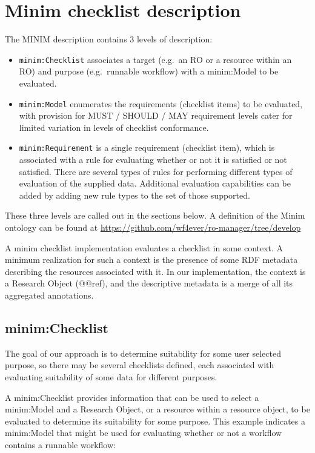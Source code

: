 \documentclass[]{article}
\author{}
\date{}
\begin{document}
{
\hypersetup{linkcolor=black}
\setcounter{tocdepth}{3}
\tableofcontents
}
\section{Minim checklist description}

The MINIM description contains 3 levels of description:

\begin{itemize}
\itemsep1pt\parskip0pt
\item
  \texttt{minim:Checklist} associates a target (e.g.~an RO or a resource
  within an RO) and purpose (e.g.~runnable workflow) with a minim:Model
  to be evaluated.
\item
  \texttt{minim:Model} enumerates the requirements (checklist items) to
  be evaluated, with provision for MUST / SHOULD / MAY requirement
  levels cater for limited variation in levels of checklist conformance.
\item
  \texttt{minim:Requirement} is a single requirement (checklist item),
  which is associated with a rule for evaluating whether or not it is
  satisfied or not satisfied. There are several types of rules for
  performing different types of evaluation of the supplied data.
  Additional evaluation capabilities can be added by adding new rule
  types to the set of those supported.
\end{itemize}

These three levels are called out in the sections below. A definition of
the Minim ontology can be found at
\href{}{https://github.com/wf4ever/ro-manager/tree/develop}

A minim checklist implementation evaluates a checklist in some context.
A minimum realization for such a context is the presence of some RDF
metadata describing the resources associated with it. In our
implementation, the context is a Research Object (@@ref), and the
descriptive metadata is a merge of all its aggregated annotations.

\subsection{minim:Checklist}

The goal of our approach is to determine suitability for some user
selected purpose, so there may be several checklists defined, each
associated with evaluating suitability of some data for different
purposes.

A minim:Checklist provides information that can be used to select a
minim:Model and a Research Object, or a resource within a resource
object, to be evaluated to determine its suitability for some purpose.
This example indicates a minim:Model that might be used for evaluating
whether or not a workflow contains a runnable workflow:
\end{document}
